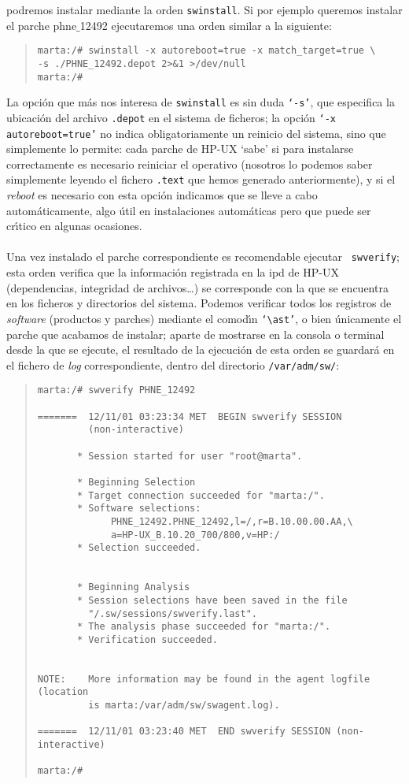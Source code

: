 podremos instalar mediante la orden {\tt swinstall}. Si por ejemplo queremos
instalar el parche {\sc phne$\_$12492} ejecutaremos una orden similar a la 
siguiente:
\begin{quote}
\begin{verbatim}
marta:/# swinstall -x autoreboot=true -x match_target=true \
-s ./PHNE_12492.depot 2>&1 >/dev/null
marta:/#
\end{verbatim}
\end{quote}
La opci\'on que m\'as nos interesa de {\tt swinstall} es sin duda {\tt `-s'},
que especifica la ubicaci\'on del archivo {\tt .depot} en el sistema de 
ficheros; la opci\'on {\tt `-x autoreboot=true'} no indica obligatoriamente un
reinicio del sistema, sino que simplemente lo permite: cada parche de HP-UX 
`sabe' si para instalarse correctamente es necesario reiniciar el operativo 
(nosotros lo podemos saber simplemente leyendo el fichero {\tt .text} que hemos
generado anteriormente), y si el {\it reboot} es necesario con esta opci\'on 
indicamos que se lleve a cabo autom\'aticamente, algo \'util en instalaciones
autom\'aticas pero que puede ser cr\'{\i}tico en algunas ocasiones.\\
\\Una vez instalado el parche correspondiente es recomendable ejecutar {\tt 
swverify}; esta orden verifica que la informaci\'on registrada en la {\sc ipd}
de HP-UX (dependencias, integridad de archivos\ldots) se corresponde con la que 
se encuentra en los ficheros y directorios del sistema. Podemos verificar todos
los registros de {\it software} (productos y parches) mediante el comod\'{\i}n 
{\tt `$\ast$'}, o bien \'unicamente el parche que acabamos de instalar; aparte
de mostrarse en la consola o terminal desde la que se ejecute, el resultado de 
la ejecuci\'on de esta orden se guardar\'a en el fichero de {\it log} 
correspondiente, dentro del directorio {\tt /var/adm/sw/}:
\begin{quote}
\begin{verbatim}
marta:/# swverify PHNE_12492

=======  12/11/01 03:23:34 MET  BEGIN swverify SESSION
         (non-interactive)

       * Session started for user "root@marta".

       * Beginning Selection
       * Target connection succeeded for "marta:/".
       * Software selections:
             PHNE_12492.PHNE_12492,l=/,r=B.10.00.00.AA,\
             a=HP-UX_B.10.20_700/800,v=HP:/
       * Selection succeeded.


       * Beginning Analysis
       * Session selections have been saved in the file
         "/.sw/sessions/swverify.last".
       * The analysis phase succeeded for "marta:/".
       * Verification succeeded.


NOTE:    More information may be found in the agent logfile (location
         is marta:/var/adm/sw/swagent.log).

=======  12/11/01 03:23:40 MET  END swverify SESSION (non-interactive)

marta:/#
\end{verbatim}
\end{quote}
